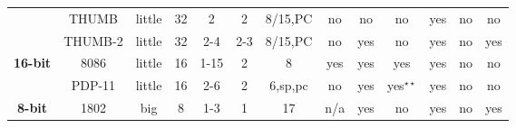 \begin{sidewaystable}[tbp]
\begin{sf}
\begin{footnotesize}
\begin{center}
\begin{tabular}{|c|c||c|c|c|c|c|c|c|c|c|c|c|}
                 & %
THUMB            & %
little           & %
32               & %
2                & %
2                & %
8/15,PC          & %
no               & %
no               & %
no               & %
yes              & %
no               & %
no                 %
\\
\cline{2-13}

                 & %
THUMB-2          & %
little           & %
32               & %
2-4              & %
2-3              & %
8/15,PC          & %
no               & %
yes              & %
no               & %
yes              & %
no               & %
yes                %
\\
\cline{2-13}


\hline
\hline


\multirow{2}{*}{\bf 16-bit} & %
8086             & %
little           & %
16               & %
1-15             & %
2                & %
8                & %
yes              & %
yes              & %
yes 		 & %
yes              & %
no               & %
no                 %
\\
\cline{2-13}

                 & %
PDP-11           & %
little           & %
16               & %
2-6              & %
2                & %
6,sp,pc          & %
no               & %
yes              & %
yes$^{\star\star}$& %
yes              & %
no               & %
no                 %
\\
\cline{2-13}


\hline
\hline



\multirow{2}{*}{\bf 8-bit} &
1802		& %
big		& %
8		& %
1-3		& %
1		& %
17		& %
n/a		& %
yes		& %
no		& %
yes		& %
no		& %
yes		%
\\
\cline{2-13}


\end{tabular}
\end{center}
\end{footnotesize}
\end{sf}
\end{sidewaystable}
